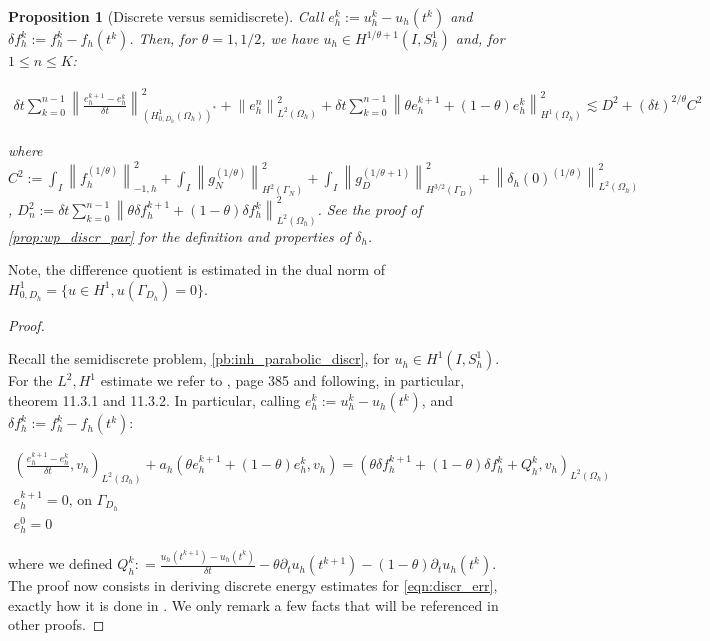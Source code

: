 \documentclass[english,a4paper,9pt,oneside]{scrbook}	%
\theoremstyle{break}
\newtheorem{prop}[equation]{Proposition}
\newenvironment{mproof}[1][\proofname]{%
  \begin{proof}[#1]$ $\par\nobreak\ignorespaces
}{%
  \end{proof}
}
\renewcommand*{\proofname}{Proof}
\theoremstyle{remark}
\newcommand{\ds}{\displaystyle}
\newcommand{\norm}[1]{\left\lVert#1\right\rVert}
\begin{document}
\begin{appendices}
\begin{prop}[Discrete versus semidiscrete]
Call $e_h^k:=u_h^k-u_h(t^k)$ and $\delta f_h^k:=f_h^k-f_h(t^k)$. Then, for $\theta=1, 1/2$, we have $u_h \in H^{1/\theta+1}(I, S^1_h)$ and, for $1\leq n \leq K$:

\begin{align*}
\delta t \sum_{k=0}^{n-1} \norm{ \frac{e_{h}^{k+1}-e_h^k}{\delta t}}_{(H^1_{0,D_h}(\Omega_h))^*}^2 + \norm{e_{h}^{n}}_{L^2(\Omega_h)}^2 + \delta t \sum_{k=0}^{n-1}\norm{\theta e_h^{k+1}+(1-\theta)e^k_h}_{H^1(\Omega_h)}^2 \lesssim 
D^2 + (\delta t)^{2/\theta} C^2
\end{align*}

where $C^2:=\ds \int_I \norm{f^{(1/\theta)}_h}_{-1,h}^2+\int_I\norm{ g_{N}^{(1/\theta)}}_{H^{2}(\Gamma_{N})}^2 + \int_I\norm{g_D^{(1/\theta+1)}}_{H^{3/2}(\Gamma_D)}^2 + \norm{\delta_{h}(0)^{(1/\theta)}}_{L^2(\Omega_h)}^2$,  $\ds D_n^2:= \ds {\delta t\sum_{k=0}^{n-1} \norm{\theta \delta f_h^{k+1}+(1-\theta)\delta f_h^k}_{L^2(\Omega_h)}^2}$.
See the proof of \cref{prop:wp_discr_par} for the definition and properties of $\delta_h$.

\end{prop}

Note, the difference quotient is estimated in the dual norm of $H^1_{0,D_h}=\{u \in H^1, u(\Gamma_{D_h})=0\}$.

\begin{mproof}

Recall the semidiscrete problem, \cref{pb:inh_parabolic_discr}, for  $u_h \in H^1(I, S^1_h)$. For the $L^2, H^1$ estimate we refer to \cite{quarteroni}, page 385 and following, in particular, theorem 11.3.1 and 11.3.2. In particular, calling $e_h^k:=u_h^k-u_h(t^k)$, and $\delta f_h^k:=f_h^k-f_h(t^k)$:

\begin{align}
\label{eqn:discr_err}
\left ( \frac{e_{h}^{k+1}-e_h^k}{\delta t}, v_h\right)_{L^2(\Omega_h)} + a_h(\theta e_h^{k+1}+(1-\theta)e^k_h, v_h) = (\theta \delta f_h^{k+1}+(1-\theta)\delta f_h^k + Q_h^k, v_h)_{L^2(\Omega_h)} \\
e_h^{k+1}=0  \text{,  on } \Gamma_{D_h}\\
e_h^0=0
\end{align}

where we defined $Q_h^k:\ds =\frac{u_{h}(t^{k+1})-u_h(t^k)}{\delta t} -\theta \partial_t u_h(t^{k+1}) - (1-\theta)\partial_tu_h(t^k)$. The proof now consists in deriving discrete energy estimates for \cref{eqn:discr_err}, exactly how it is done in \cite{quarteroni}. We only remark a few facts that will be referenced in other proofs.


\end{mproof}
\end{appendices}
\end{document}

